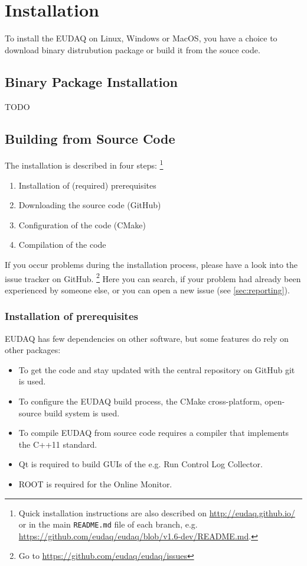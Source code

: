 \section{Installation}
To install the EUDAQ on Linux, Windows or MacOS, you have a choice to download binary distrubution package or build it from the souce code.

\subsection{Binary Package Installation}
TODO


\subsection{Building from Source Code}

The installation is described in four steps:%
\footnote{Quick installation instructions are also described on \url{http://eudaq.github.io/} or in the main \texttt{README.md} file of each branch, e.g. \url{https://github.com/eudaq/eudaq/blob/v1.6-dev/README.md}.}
\begin{enumerate}
\item Installation of (required) prerequisites
\item Downloading the source code (GitHub)
\item Configuration of the code (CMake)
\item Compilation of the code
\end{enumerate}

If you occur problems during the installation process, please have a look into the issue tracker on GitHub.%
\footnote{Go to \url{https://github.com/eudaq/eudaq/issues}} 
Here you can search, if your problem had already been experienced by someone else, or you can open a new issue (see \autoref{sec:reporting}).

\subsubsection{Installation of prerequisites}

EUDAQ has few dependencies on other software, but some features do rely on other packages:
\begin{itemize}
\item To get the code and stay updated with the central repository on GitHub git is used.
\item To configure the EUDAQ build process, the CMake cross-platform, open-source build system is used.
\item To compile EUDAQ from source code requires a compiler that implements the C++11 standard.
\item Qt is required to build GUIs of the e.g. Run Control Log Collector. 
\item ROOT is required for the Online Monitor.
\end{itemize}

